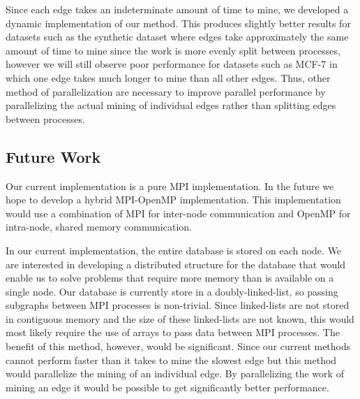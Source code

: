 Since each edge takes an indeterminate amount of time to mine, we developed
a dynamic implementation of our method. This produces slightly better results
for datasets such as the synthetic dataset where edges take approximately
the same amount of time to mine since the work is more evenly split between
processes, however we will still observe poor performance for datasets such as
MCF-7 in which one edge takes much longer to mine than all other edges. Thus,
other method of parallelization are necessary to improve parallel performance
by parallelizing the actual mining of individual edges rather than splitting
edges between processes.

\subsection{Future Work}
\label{subsec:future}

Our current implementation is a pure MPI implementation. In the future we
hope to develop a hybrid MPI-OpenMP implementation. This implementation
would use a combination of MPI for inter-node communication and OpenMP
for intra-node, shared memory communication.

In our current implementation, the entire database is stored on each node.
We are interested in developing a distributed structure for the database that
would enable us to solve problems that require more memory than is available
on a single node. Our database is currently store in a doubly-linked-list, so
passing subgraphs between MPI processes is non-trivial. Since
linked-lists are not stored in contiguous memory and the size of these
linked-lists are not known, this would most likely require the use of arrays
to pass data between MPI processes.
The benefit of this method, however, would be significant. Since our current
methods cannot perform faster than it takes to mine the slowest edge but this
method would parallelize the mining of an individual edge. By parallelizing
the work of mining an edge it would be possible to get significantly better
performance.
